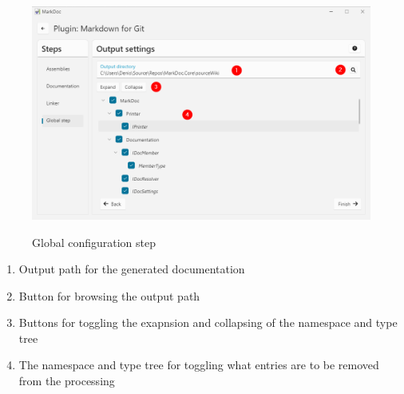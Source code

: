 \begin{figure}[H]
    \caption{Global configuration step}
    \includegraphics[width=\linewidth]{img/pluginGlobal.png}
    \label{fig:pluginGlobal}
\end{figure}

\begin{enumerate}
    \item Output path for the generated documentation
    \item Button for browsing the output path
    \item Buttons for toggling the exapnsion and collapsing of the namespace and type tree
    \item The namespace and type tree for toggling what entries are to be removed from the processing
\end{enumerate}